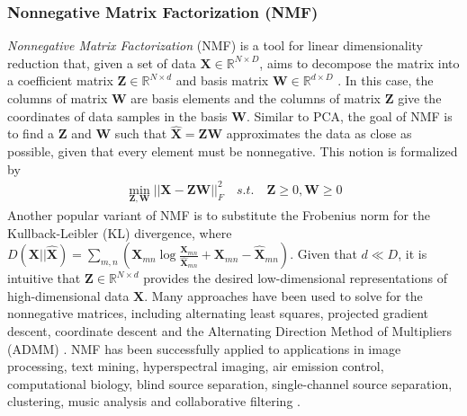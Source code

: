 \subsubsection{Nonnegative Matrix Factorization (NMF)} \label{sec:NMF}
\textit{Nonnegative Matrix Factorization} (NMF) is a tool for linear dimensionality reduction that, given a set of data $\bm{X} \in \mathbb{R}^{N \times D}$, aims to decompose the matrix into a coefficient matrix $\bm{Z} \in \mathbb{R}^{N \times d}$ and basis matrix $\bm{W} \in \mathbb{R}^{d \times D}$ \citep{Gillis2014NMF}.  In this case, the columns of matrix $\bm{W}$ are basis elements and  the columns of matrix $\bm{Z}$  give the coordinates of data samples in the basis $\bm{W}$. Similar to PCA, the goal of NMF is to find a $\bm{Z}$ and $\bm{W}$ such that $\hat{\bm{X}} = \bm{Z}\bm{W}$ approximates the data as close as possible, given that every element must be nonnegative.  This notion is formalized by
\begin{align}
	\min_{\bm{Z},\bm{W}} || \bm{X} - \bm{Z}\bm{W} ||^{2}_{F} \quad s.t. \quad \bm{Z} \geq 0, \bm{W} \geq 0
\end{align}
\noindent
Another popular variant of NMF is to substitute the Frobenius norm for the Kullback-Leibler (KL) divergence, where $D(\bm{X}||\hat{\bm{X}}) = \sum_{m,n}(\bm{X}_{mn} \log \frac{\bm{X}_{mn}}{\hat{\bm{X}}_{mn}} + \bm{X}_{mn} - \hat{\bm{X}}_{mn})$.  Given that $d \ll D$, it is intuitive that $\bm{Z} \in \mathbb{R}^{N \times d}$ provides the desired low-dimensional representations of high-dimensional data $\bm{X}.$  Many approaches have been used to solve for the nonnegative matrices, including alternating least squares, projected gradient descent, coordinate descent and the Alternating Direction Method of Multipliers (ADMM) \citep{Chao2019RecentAdvancesSupervisedDimRed}.  NMF has been successfully applied to applications in image processing, text mining, hyperspectral imaging, air emission control, computational biology, blind source separation, single-channel source separation, clustering, music analysis and collaborative filtering \citep{Gillis2014NMF}.  

